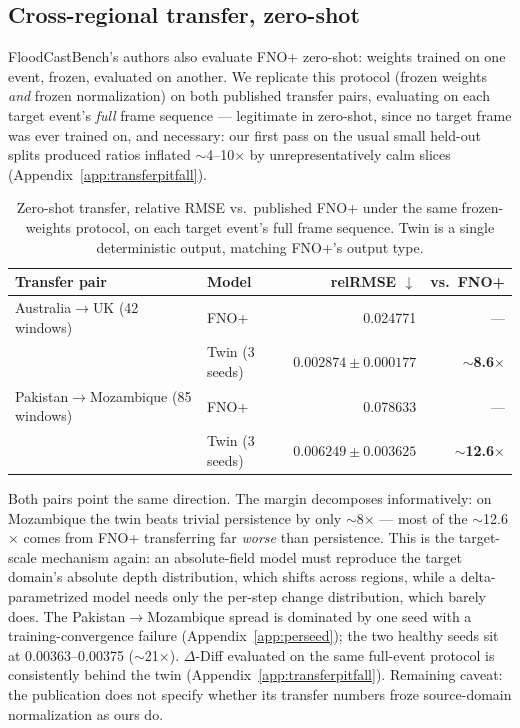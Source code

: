 \documentclass[11pt]{article}
\newcommand{\ours}{\mbox{$\Delta$-Diff}}
\newcommand{\twin}{\mbox{Twin}}
\begin{document}
\subsection{Cross-regional transfer, zero-shot}
\label{sec:zeroshot}
FloodCastBench's authors also evaluate FNO+ zero-shot: weights trained on
one event, frozen, evaluated on another. We replicate this protocol
(frozen weights \emph{and} frozen normalization) on both published
transfer pairs, evaluating on each target event's \emph{full} frame
sequence --- legitimate in zero-shot, since no target frame was ever
trained on, and necessary: our first pass on the usual small held-out
splits produced ratios inflated $\sim$4--10$\times$ by
unrepresentatively calm slices (Appendix~\ref{app:transferpitfall}).

\begin{table}[H]
\centering
\caption{Zero-shot transfer, relative RMSE vs.\ published FNO+ under the
same frozen-weights protocol, on each target event's full frame
sequence. \twin{} is a single deterministic output, matching FNO+'s
output type.}
\label{tab:zeroshot}
\begin{tabular}{llrr}
\toprule
Transfer pair & Model & relRMSE $\downarrow$ & vs.\ FNO+ \\
\midrule
Australia$\to$UK (42 windows) & FNO+ \citep{floodcastbench2025} & 0.024771 & --- \\
 & \twin{} (3 seeds) & $\mathbf{0.002874 \pm 0.000177}$ & $\sim$\textbf{8.6$\times$} \\
\midrule
Pakistan$\to$Mozambique (85 windows) & FNO+ \citep{floodcastbench2025} & 0.078633 & --- \\
 & \twin{} (3 seeds) & $\mathbf{0.006249 \pm 0.003625}$ & $\sim$\textbf{12.6$\times$} \\
\bottomrule
\end{tabular}
\end{table}

Both pairs point the same direction. The margin decomposes informatively:
on Mozambique the twin beats trivial persistence by only
$\sim$8$\times$ --- most of the $\sim$12.6$\times$ comes from FNO+
transferring far \emph{worse} than persistence. This is the target-scale
mechanism again: an absolute-field model must reproduce the target
domain's absolute depth distribution, which shifts across regions, while
a delta-parametrized model needs only the per-step change distribution,
which barely does. The Pakistan$\to$Mozambique spread is dominated by one
seed with a training-convergence failure (Appendix~\ref{app:perseed});
the two healthy seeds sit at 0.00363--0.00375 ($\sim$21$\times$). \ours{}
evaluated on the same full-event protocol is consistently behind the twin
(Appendix~\ref{app:transferpitfall}). Remaining caveat: the publication
does not specify whether its transfer numbers froze source-domain
normalization as ours do.
\end{document}
